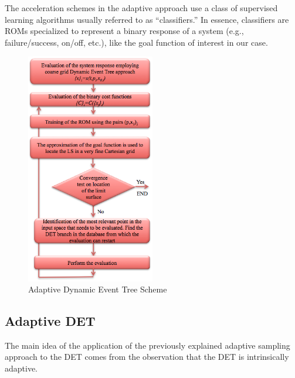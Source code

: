 The acceleration schemes in the adaptive approach use a class of supervised learning algorithms usually referred to as “classifiers.” In essence, classifiers are ROMs specialized to represent a binary response of a system (e.g., failure/success, on/off, etc.), like the goal function of interest in our case.
\begin{figure}[h]
  \centering
     \includegraphics[width=0.5\textwidth]{figures/AdaptiveDET.png}
  \caption{Adaptive Dynamic Event Tree Scheme}
  \label{fig:AdaptiveDET}
\end{figure}
\subsection{Adaptive DET} 
The main idea of the application of the previously explained adaptive sampling approach to the DET comes from the observation that the DET is intrinsically adaptive.


